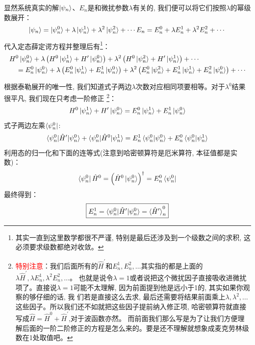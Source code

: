 \documentclass[a4paper,zihao=-4,linespread=1]{ctexrep}
\newenvironment{lequation}{\large\begin{equation}}{\end{equation}}
\begin{document}
    显然系统真实的解$\ket{\psi_n}$、$E_n$是和微扰参数$\lambda$有关的, 我们便可以将它们按照$\lambda$的幂级数展开：
    \begin{equation}
        \ket{\psi_n}=\ket{\psi_n^0}+\lambda \ket{\psi_n^1}+\lambda^2\ket{\psi_n^2}+\cdots\\
        E_n=E_n^0+\lambda E_n^1+\lambda^2 E_n^2+\cdots
    \end{equation}
    代入定态薛定谔方程并整理后有\footnote{其实一直到这里数学都很不严谨, 特别是最后还涉及到一个级数之间的求积, 这必须要求级数都绝对收敛。}：
    \begin{equation}
        \label{eq:7.3}
        \begin{aligned}
            &H^0 \ket{\psi_n^0}+\lambda\left(H^0 \ket{\psi_n^1}+H^{\prime} \ket{\psi_n^0}\right)+\lambda^2\left(H^0 \ket{\psi_n^2}+H^{\prime} \ket{\psi_n^1}\right)+\cdots \\
            &\quad=E_n^0 \ket{\psi_n^0}+\lambda\left(E_n^0 \ket{\psi_n^1}+E_n^1 \ket{\psi_n^0}\right)+\lambda^2\left(E_n^0 \ket{\psi_n^2}+E_n^1 \ket{\psi_n^1}+E_n^2 \ket{\psi_n^0}\right)+\cdots
        \end{aligned}
    \end{equation}
    
    根据泰勒展开的唯一性, 我们知道式子两边$\lambda$次数对应相同项要相等。对于$\lambda^0$结果很平凡, 我们现在只考虑一阶修正
    \footnote{\textcolor{red}{特别注意}：我们后面所有的$\hat{H}^\prime$和$E_n^1,E_n^2,\ldots$其实指的都是上面的$\lambda\hat{H}^\prime,\lambda E_n^1,\lambda^2 E_n^2,\ldots$。
    也就是说令$\lambda=1$或者说把这个微扰因子直接吸收进微扰项了。直接说$\lambda=1$可能不太理解, 因为前面提到他是远小于1的, 其实如果你观察的够仔细的话, 我
    们若是直接这么去求, 最后还需要将结果前面乘上$\lambda,\lambda^2,\ldots$这些因子。所以我们还不如就把这些因子提前纳入修正项, 哈密顿算符就直接写成$\hat{H}=\hat{H}^0+\hat{H}^\prime$,对于波函数亦然。
    而前面我们那么写是为了让我们方便理解后面的一阶二阶修正的方程是怎么来的。要是还不理解就想象成麦克劳林级数在1处取值吧。}：
    \begin{equation}
        \label{eq:7.4}
        H^0 \ket{\psi_n^1}+H^{\prime} \ket{\psi_n^0}=E_n^0 \ket{\psi_n^1}+E_n^1 \ket{\psi_n^0}
    \end{equation}
    式子两边左乘$\bra{\psi_n^0}$:
    \[\braket{\psi_n^0|\hat{H}^\prime|\psi_n^0}+\braket{\psi_n^0|\hat{H}^0|\psi_n^1}=E_n^1\braket{\psi_n^0|\psi_n^0}+E_n^0\braket{\psi_n^0|\psi_n^1}\]
    利用态的归一化和下面的连等式(注意到哈密顿算符是厄米算符, 本征值都是实数)：
    \[
        \bra{\psi_n^0}\hat{H}^0=\left(\hat{H}^0\ket{\psi_n^0}\right)^\dagger=E_n^0\bra{\psi_n^0}
    \]
    最终得到：
    \begin{lequation}
        \label{eq:7.5}
        \boxed{
            E_n^1=\braket{\psi_n^0|\hat{H}^\prime|\psi_n^0}=\braket{\hat{H}^\prime}_n^0
        }
    \end{lequation}
    
\end{document}
